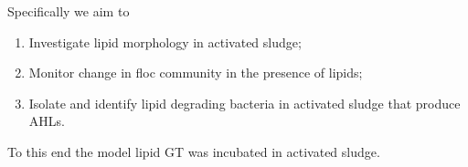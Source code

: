 \documentclass[11pt]{article}
\begin{document}
\noindent
Specifically we aim to

\begin{enumerate}
\item Investigate lipid morphology in activated sludge;
\item Monitor change in floc community in the presence of lipids;
\item Isolate and identify lipid degrading bacteria in activated sludge that produce AHLs.
\end{enumerate}
To this end the model lipid GT was incubated in activated sludge.





\end{document}
